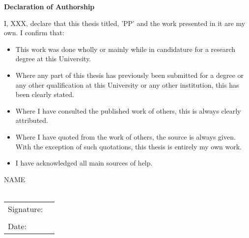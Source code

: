 \begin{center}
    \Large
    \textbf{Declaration of Authorship}
\end{center}

\vspace*{1em}

\noindent I, XXX, declare that this thesis titled, 'PP' and the work presented in it are my own. I confirm that:

\vspace*{3em}

\begin{itemize}
    \item This work was done wholly or mainly while in candidature for a research degree at this University.
    \item Where any part of this thesis has previously been submitted for a degree or any other qualification at this University or any other institution, this has been clearly stated.
    \item Where I have consulted the published work of others, this is always clearly attributed.
    \item Where I have quoted from the work of others, the source is always given. With the exception of such quotations, this thesis is entirely my own work.
    \item I have acknowledged all main sources of help.
\end{itemize}

\vspace*{2.5em}

\noindent NAME \\ \\
\begin{tabular}{@{}p{.72in}p{3.0in}@{}}
    Signature: & \hrulefill \\
    &\\
    Date:   & \hrulefill
\end{tabular}

